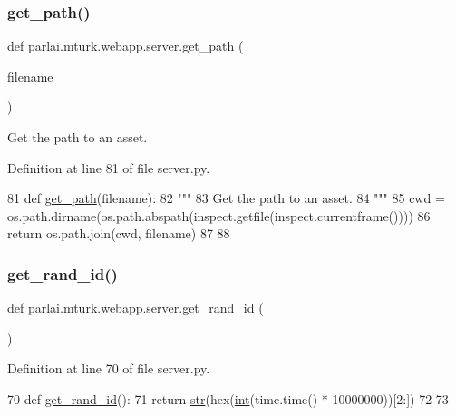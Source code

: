 \subsubsection{\texorpdfstring{get\+\_\+path()}{get\_path()}}
{\footnotesize\ttfamily def parlai.\+mturk.\+webapp.\+server.\+get\+\_\+path (\begin{DoxyParamCaption}\item[{}]{filename }\end{DoxyParamCaption})}

\begin{DoxyVerb}Get the path to an asset.
\end{DoxyVerb}
 

Definition at line 81 of file server.\+py.


\begin{DoxyCode}
81 \textcolor{keyword}{def }\hyperlink{namespaceparlai_1_1mturk_1_1webapp_1_1server_abf5dde99069f271f98bd20e7fb7cdccd}{get\_path}(filename):
82     \textcolor{stringliteral}{"""}
83 \textcolor{stringliteral}{    Get the path to an asset.}
84 \textcolor{stringliteral}{    """}
85     cwd = os.path.dirname(os.path.abspath(inspect.getfile(inspect.currentframe())))
86     \textcolor{keywordflow}{return} os.path.join(cwd, filename)
87 
88 
\end{DoxyCode}
\mbox{\label{namespaceparlai_1_1mturk_1_1webapp_1_1server_a762795ce59d6dbcb111fd9162a870f9f}} 
\subsubsection{\texorpdfstring{get\+\_\+rand\+\_\+id()}{get\_rand\_id()}}
{\footnotesize\ttfamily def parlai.\+mturk.\+webapp.\+server.\+get\+\_\+rand\+\_\+id (\begin{DoxyParamCaption}{ }\end{DoxyParamCaption})}



Definition at line 70 of file server.\+py.


\begin{DoxyCode}
70 \textcolor{keyword}{def }\hyperlink{namespaceparlai_1_1mturk_1_1webapp_1_1server_a762795ce59d6dbcb111fd9162a870f9f}{get\_rand\_id}():
71     \textcolor{keywordflow}{return} \hyperlink{namespacegenerate__task__READMEs_a5b88452ffb87b78c8c85ececebafc09f}{str}(hex(\hyperlink{namespacelanguage__model_1_1eval__ppl_a7d12ee00479673c5c8d1f6d01faa272a}{int}(time.time() * 10000000))[2:])
72 
73 
\end{DoxyCode}
\mbox{\label{namespaceparlai_1_1mturk_1_1webapp_1_1server_a49eb9835228f9f47f9aa55bc6369c23f}} 
